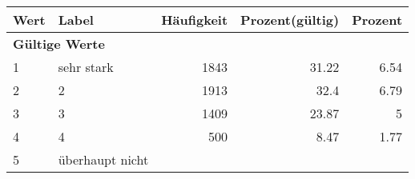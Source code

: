      \begin{longtable}{lXrrr}
     \toprule
     \textbf{Wert} & \textbf{Label} & \textbf{Häufigkeit} & \textbf{Prozent(gültig)} & \textbf{Prozent} \\
     \endhead
     \midrule
     \multicolumn{5}{l}{\textbf{Gültige Werte}}\\

     1 &
     \multicolumn{1}{X}{ sehr stark   } &


       \num{1843} &
       \num[round-mode=places,round-precision=2]{31.22} &
         \num[round-mode=places,round-precision=2]{6.54} \\

     2 &
     \multicolumn{1}{X}{ 2   } &


       \num{1913} &
       \num[round-mode=places,round-precision=2]{32.4} &
         \num[round-mode=places,round-precision=2]{6.79} \\

     3 &
     \multicolumn{1}{X}{ 3   } &


       \num{1409} &
       \num[round-mode=places,round-precision=2]{23.87} &
         \num[round-mode=places,round-precision=2]{5} \\

     4 &
     \multicolumn{1}{X}{ 4   } &


       \num{500} &
       \num[round-mode=places,round-precision=2]{8.47} &
         \num[round-mode=places,round-precision=2]{1.77} \\

     5 &
     \multicolumn{1}{X}{ überhaupt nicht   } &



\end{longtable}

